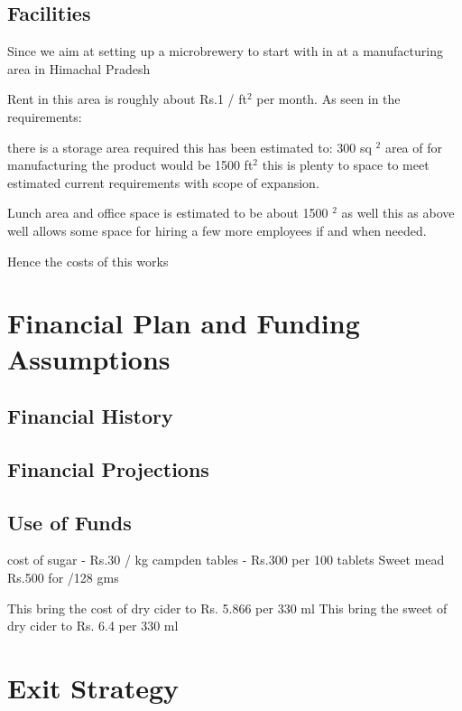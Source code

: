 \documentclass[11pt]{article}
\begin{document}
  \subsection{Facilities}
Since we aim at setting up a microbrewery to start with in at a manufacturing area in Himachal Pradesh

Rent in this area is roughly about Rs.1 / ft$^2$ per month.
As seen in the requirements:

there is a storage area required this has been estimated to: 300 sq $^2$
area of for manufacturing the product would be 1500 ft$^2$ this is plenty to space to meet estimated current requirements with scope of expansion.

Lunch area and office space is estimated to be about 1500 $^2$ as well this as above well allows some space for hiring a few more employees if and when needed.

Hence the costs of this works 
\section{Financial Plan and Funding Assumptions}
  \subsection{Financial History}
  \subsection{Financial Projections}
  \subsection{Use of Funds}
   
cost of sugar -  Rs.30 / kg
campden tables  - Rs.300 per 100 tablets
Sweet mead Rs.500 for /128 gms 


This bring the cost of dry cider to Rs. 5.866 per 330 ml
This bring the sweet of dry cider to Rs. 6.4 per 330 ml
\section{Exit Strategy}
\end{document}
